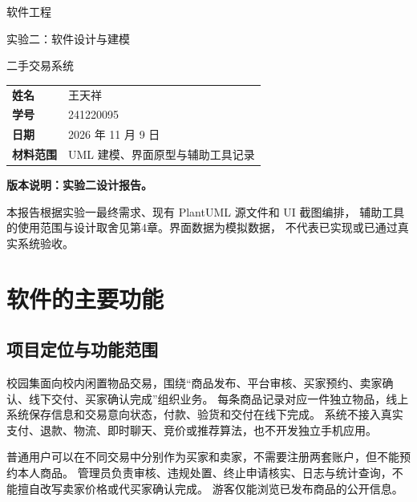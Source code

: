 \documentclass[UTF8,zihao=-4,a4paper,fontset=none]{ctexart}
\begin{document}
\begin{titlepage}
\thispagestyle{empty}
\vspace*{15mm}
\begingroup
\centering
\coverfangsong
{\fontsize{28}{42}\selectfont 软件工程}\par
\vspace{10mm}
{\fontsize{18}{28}\selectfont 实验二：软件设计与建模}\par
\vspace{8mm}
{\fontsize{18}{28}\selectfont 二手交易系统}\par
\endgroup
\vspace{8mm}
\noindent{\color{forest}\rule{\textwidth}{1.2pt}}\par
\vspace{12mm}
\begin{tabular}{@{}ll}
\textbf{姓名} & 王天祥\\[8pt]
\textbf{学号} & 241220095\\[8pt]
\textbf{日期} & 2026 年 11 月 9 日\\[8pt]
\textbf{材料范围} & UML 建模、界面原型与辅助工具记录
\end{tabular}
\vfill
\begin{keypoint}
\textbf{版本说明：实验二设计报告。}\par
本报告根据实验一最终需求、现有 PlantUML 源文件和 UI 截图编排，
辅助工具的使用范围与设计取舍见第4章。界面数据为模拟数据，
不代表已实现或已通过真实系统验收。
\end{keypoint}
\end{titlepage}
\setcounter{tocdepth}{2}
\begingroup
\small\linespread{1.0}\selectfont
\tableofcontents
\endgroup
\clearpage
{}
\section{软件的主要功能}
\subsection{项目定位与功能范围}
校园集面向校内闲置物品交易，围绕“商品发布、平台审核、买家预约、卖家确认、线下交付、买家确认完成”组织业务。
每条商品记录对应一件独立物品，线上系统保存信息和交易意向状态，付款、验货和交付在线下完成。
系统不接入真实支付、退款、物流、即时聊天、竞价或推荐算法，也不开发独立手机应用。


普通用户可以在不同交易中分别作为买家和卖家，不需要注册两套账户，但不能预约本人商品。
管理员负责审核、违规处置、终止申请核实、日志与统计查询，不能擅自改写卖家价格或代买家确认完成。
游客仅能浏览已发布商品的公开信息。
\end{document}
